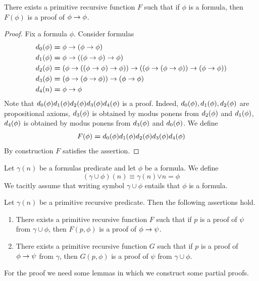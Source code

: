 \documentclass[10pt]{amsart}
\newcommand{\mor}{\boldsymbol{\vee}}
\newcommand{\meq}{\boldsymbol{=}}
\begin{document}
\begin{fact}\label{fact:provability_of_identity}
  There exists a primitive recursive function $F$ such that if $\phi$ is a formula, then $F(\phi)$ is a proof of $\phi \rightarrow \phi$.
\end{fact}
\begin{proof}
  Fix a formula $\phi$. Consider formulas
  \begin{align*}
    &d_{\rm{0}}(\phi) \meq \phi \ra \left(\phi \ra \phi\right)\\
    &d_{\rm{1}}(\phi) \meq \phi \ra \left(\left(\phi \ra \phi\right) \ra \phi\right)\\
    &d_{\rm{2}}(\phi) \meq \left(\phi \ra \left(\left(\phi \ra \phi\right) \ra \phi\right)\right) \ra \left(\left(\phi \ra \left(\phi \ra \phi\right)\right) \ra \left(\phi \ra \phi\right)\right)\\
    &d_{\rm{3}}(\phi) \meq \left(\phi \ra \left(\phi \ra \phi\right)\right) \ra \left(\phi \ra \phi\right)\\
    &d_{\rm{4}}(n) \meq \phi \ra \phi\\
  \end{align*}
  Note that $d_{\rm{0}}(\phi)d_{\rm{1}}(\phi)d_{\rm{2}}(\phi)d_{\rm{3}}(\phi)d_{\rm{4}}(\phi)$ is a proof. Indeed, $d_{\rm{0}}(\phi),d_{\rm{1}}(\phi),d_{\rm{2}}(\phi)$ are propositional axioms, $d_{\rm{3}}(\phi)$ is obtained by modus ponens from $d_{\rm{2}}(\phi)$ and $d_{\rm{1}}(\phi)$, $d_{\rm{4}}(\phi)$ is obtained by modus ponens from $d_{\rm{3}}(\phi)$ and $d_{\rm{0}}(\phi)$. We define
  $$F(\phi) \meq d_{\rm{0}}(\phi)d_{\rm{1}}(\phi)d_{\rm{2}}(\phi)d_{\rm{3}}(\phi)d_{\rm{4}}(\phi)$$
  By construction $F$ satisfies the assertion.
\end{proof}
\noindent
Let $\gamma(n)$ be a formulas predicate and let $\phi$ be a formula. We define
$$\left(\gamma \cup \phi\right)(n) \equiv \gamma(n) \mor n \meq \phi$$
We tacitly assume that writing symbol $\gamma \cup \phi$ entails that $\phi$ is a formula.

\begin{theorem}
  Let $\gamma(n)$ be a primitive recursive predicate. Then the following assertions hold.
 \begin{enumerate}[label=\emph{\textbf{(\arabic*)}}, leftmargin=3.0em]
   \item There exists a primitive recursive function $F$ such that if $p$ is a proof of $\psi$ from $\gamma \cup \phi$, then $F(p,\phi)$ is a proof of $\phi \rightarrow \psi$.
    \item There exists a primitive recursive function $G$ such that if $p$ is a proof of $\phi \rightarrow \psi$ from $\gamma$, then $G(p,\phi)$ is a proof of $\psi$ from $\gamma \cup \phi$.
  \end{enumerate}
\end{theorem}
\noindent
For the proof we need some lemmas in which we construct some partial proofs.
\end{document}

